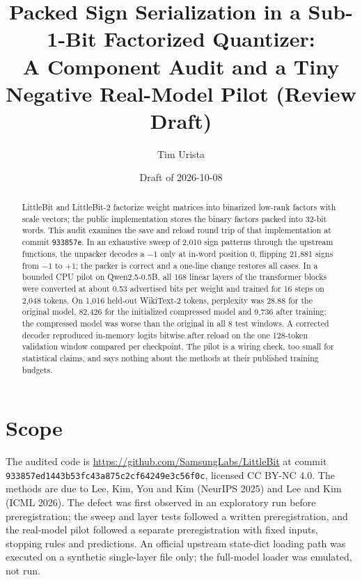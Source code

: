 \documentclass[11pt]{article}
\title{Packed Sign Serialization in a Sub-1-Bit Factorized Quantizer:\\
A Component Audit and a Tiny Negative Real-Model Pilot (Review Draft)}
\author{Tim Urista}
\date{Draft of 2026-10-08}
\begin{document}
\maketitle

\begin{center}
\end{center}

\begin{abstract}
LittleBit and LittleBit-2 factorize weight matrices into binarized low-rank factors with scale
vectors; the public implementation stores the binary factors packed into 32-bit words. This audit
examines the save and reload round trip of that implementation at commit \texttt{933857e}. In an
exhaustive sweep of 2{,}010 sign patterns through the upstream functions, the unpacker decodes a
$-1$ only at in-word position 0, flipping 21{,}881 signs from $-1$ to $+1$; the packer is correct
and a one-line change restores all cases. In a bounded CPU pilot on Qwen2.5-0.5B, all 168 linear
layers of the transformer blocks were converted at about 0.53 advertised bits per weight and
trained for 16 steps on 2{,}048 tokens. On 1{,}016 held-out WikiText-2 tokens, perplexity was
28.88 for the original model, 82{,}426 for the initialized compressed model and 9{,}736 after
training; the compressed model was worse than the original in all 8 test windows. A corrected
decoder reproduced in-memory logits bitwise after reload on the one 128-token validation window
compared per checkpoint. The pilot is a wiring check, too small for statistical claims, and says
nothing about the methods at their published training budgets.
\end{abstract}

\section{Scope}
The audited code is \url{https://github.com/SamsungLabs/LittleBit} at commit\\
\texttt{933857ed1443b53fc43a8}\allowbreak\texttt{75c2cf64249e3c56f0c}, licensed CC BY-NC 4.0. The methods are due to
Lee, Kim, You and Kim (NeurIPS 2025) and Lee and Kim (ICML 2026). The defect was first observed in
an exploratory run before preregistration; the sweep and layer tests followed a written
preregistration, and the real-model pilot followed a separate preregistration with fixed inputs,
stopping rules and predictions. An official upstream state-dict loading path was executed on a
synthetic single-layer file only; the full-model loader was emulated, not run.
\end{document}

